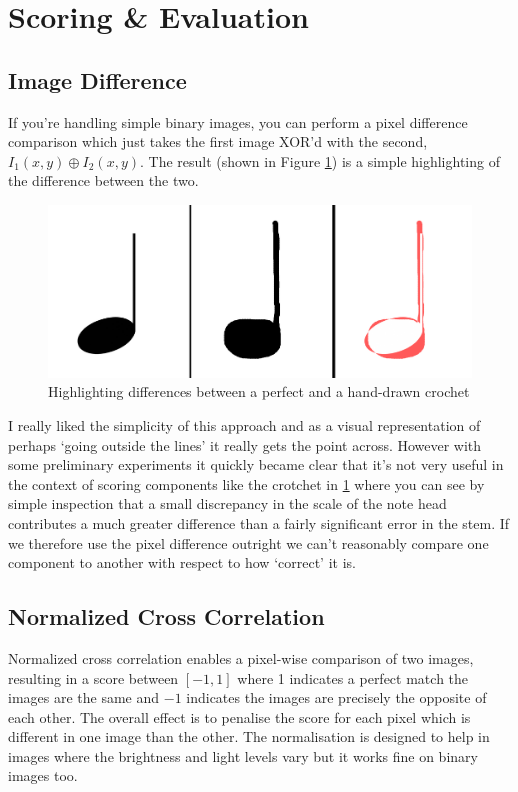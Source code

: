 \section{Scoring \& Evaluation}

\subsection{Image Difference}

If you're handling simple binary images, you can perform a pixel difference comparison which just takes the first image XOR'd with the second, $I_1(x, y) \oplus I_2(x, y)$. The result (shown in Figure \cref{fig:crotchet-diff}) is a simple highlighting of the difference between the two.

\begin{figure}[h!]
  \centering
  \includegraphics[width=\linewidth]{gfx/crochet-all.png}
  \caption{Highlighting differences between a perfect and a hand-drawn crochet}
  \label{fig:crotchet-diff}
\end{figure}

I really liked the simplicity of this approach and as a visual representation of perhaps `going outside the lines' it really gets the point across. However with some preliminary experiments it quickly became clear that it's not very useful in the context of scoring components like the crotchet in \cref{fig:crotchet-diff} where you can see by simple inspection that a small discrepancy in the scale of the note head contributes a much greater difference than a fairly significant error in the stem. If we therefore use the pixel difference outright we can't reasonably compare one component to another with respect to how `correct' it is.

\subsection{Normalized Cross Correlation}

Normalized cross correlation enables a pixel-wise comparison of two images, resulting in a score between $[-1, 1]$ where 1 indicates a perfect match \eg the images are the same and $-1$ indicates the images are precisely the opposite of each other. The overall effect is to penalise the score for each pixel which is different in one image than the other. The normalisation is designed to help in images where the brightness and light levels vary but it works fine on binary images too.

